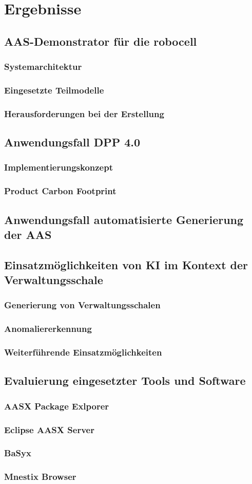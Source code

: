 \section{Ergebnisse}
\subsection{AAS-Demonstrator für die robocell}
\subsubsection{Systemarchitektur}
\subsubsection{Eingesetzte Teilmodelle}
\subsubsection{Herausforderungen bei der Erstellung}
\subsection{Anwendungsfall DPP 4.0}
\subsubsection{Implementierungskonzept}
\subsubsection{Product Carbon Footprint}
\subsection{Anwendungsfall automatisierte Generierung der AAS}
\subsection{Einsatzmöglichkeiten von KI im Kontext der Verwaltungsschale}
\subsubsection{Generierung von Verwaltungsschalen}
\subsubsection{Anomaliererkennung}
\subsubsection{Weiterführende Einsatzmöglichkeiten}
\subsection{Evaluierung eingesetzter Tools und Software}
\subsubsection{AASX Package Exlporer}
\subsubsection{Eclipse AASX Server}
\subsubsection{BaSyx}
\subsubsection{Mnestix Browser}